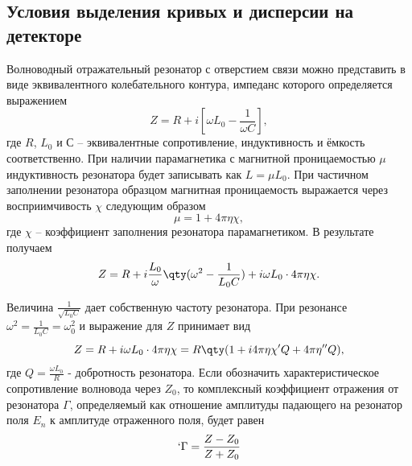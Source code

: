 \subsection{Условия выделения кривых и дисперсии на детекторе}%


Волноводный отражательный резонатор с отверстием связи можно представить в виде эквивалентного колебательного контура, импеданс которого определяется выражением
\begin{equation}
    \label{eq:1}
    Z = R + i [ \omega L_{0} - \frac{1}{\omega C}],
\end{equation}
где $R$, $L_{0}$ и $С$ -- эквивалентные сопротивление, индуктивность и ёмкость соответственно. При наличии парамагнетика с магнитной проницаемостью  $\mu$ индуктивность резонатора будет записывать как $L = \mu L_{0}$. При частичном заполнении резонатора образцом магнитная проницаемость выражается через восприимчивость $\chi$ следующим образом
\begin{equation}
    \label{eq:2}
    \mu = 1 + 4 \pi \eta \chi,
\end{equation}
где $\chi$ -- коэффициент заполнения резонатора парамагнетиком. В результате получаем
\begin{equation}
    \label{eq:3}
    Z = R + i \frac{L_{0}}{\omega} \qty( \omega^{2} - \frac{1}{L_{0}C}) + i \omega L_{0} \cdot 4 \pi \eta \chi.
\end{equation} 

Величина $\frac{1}{\sqrt{L_{0} C}}$ дает собственную частоту резонатора. При резонансе $\omega^2 = \frac{1}{L_{0}C} = \omega^2_0$ и выражение для $Z$ принимает вид
\begin{equation}
    \label{eq:4}
    Z = R + i \omega L_{0} \cdot 4 \pi \eta \chi = R \qty( 1 + i 4 \pi \eta \chi' Q + 4 \pi \eta'' Q),
\end{equation}
где $Q = \frac{\omega L_0}{R}$ - добротность резонатора. Если обозначить характеристическое сопротивление волновода через $Z_0$, то комплексный коэффициент отражения от резонатора  $\Gamma$, определяемый как отношение амплитуды падающего на резонатор поля  $E_n$ к амплитуде отраженного поля, будет равен
 \begin{equation}
    \label{eq:5}`
    \Gamma = \frac{Z-Z_{0}}{Z+Z_{0}}
\end{equation}

